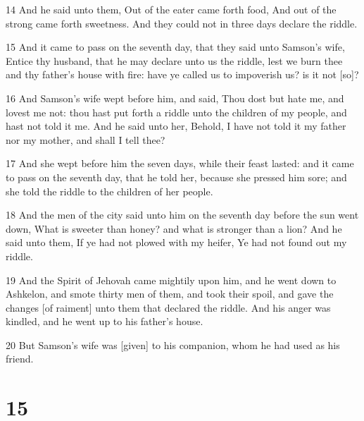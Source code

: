 \par 14 And he said unto them, Out of the eater came forth food, And out of the strong came forth sweetness. And they could not in three days declare the riddle.
\par 15 And it came to pass on the seventh day, that they said unto Samson's wife, Entice thy husband, that he may declare unto us the riddle, lest we burn thee and thy father's house with fire: have ye called us to impoverish us? is it not [so]?
\par 16 And Samson's wife wept before him, and said, Thou dost but hate me, and lovest me not: thou hast put forth a riddle unto the children of my people, and hast not told it me. And he said unto her, Behold, I have not told it my father nor my mother, and shall I tell thee?
\par 17 And she wept before him the seven days, while their feast lasted: and it came to pass on the seventh day, that he told her, because she pressed him sore; and she told the riddle to the children of her people.
\par 18 And the men of the city said unto him on the seventh day before the sun went down, What is sweeter than honey? and what is stronger than a lion? And he said unto them, If ye had not plowed with my heifer, Ye had not found out my riddle.
\par 19 And the Spirit of Jehovah came mightily upon him, and he went down to Ashkelon, and smote thirty men of them, and took their spoil, and gave the changes [of raiment] unto them that declared the riddle. And his anger was kindled, and he went up to his father's house.
\par 20 But Samson's wife was [given] to his companion, whom he had used as his friend.

\chapter{15}

